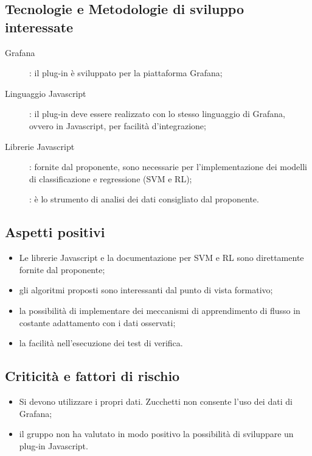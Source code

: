 \documentclass[../studio-di-fattibilita.tex]{subfiles}
\begin{document}
  \subsection{Tecnologie e Metodologie di sviluppo interessate}%
  \label{subsec:tecnologie_interessate}
  \begin{description}
    \item [Grafana]: il plug-in è sviluppato per la piattaforma Grafana;
    \item [Linguaggio Javascript]: il plug-in deve essere realizzato con lo stesso linguaggio di Grafana, ovvero in Javascript, per facilità d'integrazione;
    \item [Librerie Javascript]: fornite dal proponente, sono necessarie per l'implementazione dei modelli di classificazione e regressione (SVM e RL);
    \item []: è lo strumento di analisi dei dati consigliato dal proponente.
  \end{description}


  \subsection{Aspetti positivi}%
  \label{subsec:aspetti_positivi}
  \begin{itemize}
    \item Le librerie Javascript e la documentazione per SVM e RL sono direttamente fornite dal proponente;
    \item gli algoritmi proposti sono interessanti dal punto di vista formativo;
    \item la possibilità di implementare dei meccanismi di apprendimento di flusso in costante adattamento con i dati osservati;
    \item la facilità nell'esecuzione dei test di verifica.
  \end{itemize}


  \subsection{Criticità e fattori di rischio}%
  \label{subsec:criticita_e_fattori_di_rischio}
  \begin{itemize}
    \item Si devono utilizzare i propri dati. Zucchetti non consente l'uso dei dati di Grafana;
    \item il gruppo non ha valutato in modo positivo la possibilità di sviluppare un plug-in Javascript.
  \end{itemize}
\end{document}
